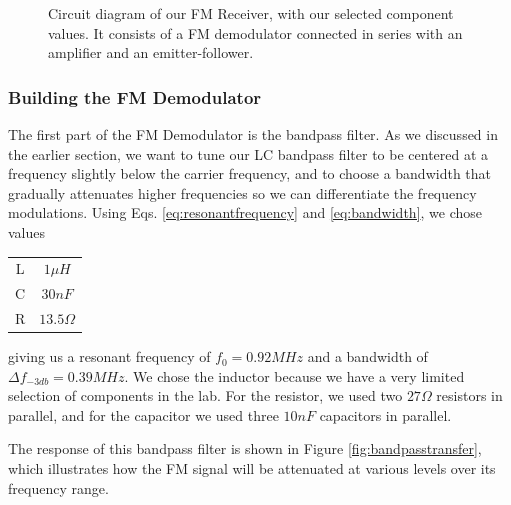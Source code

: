 \documentclass[12pt]{article}
\begin{document}
\begin{figure}[H]
\caption{Circuit diagram of our FM Receiver, with our selected component values. It consists of a FM demodulator connected in series with an amplifier and an emitter-follower.}
\label{fig:circuitdiagram}
\end{figure}

\subsubsection*{Building the FM Demodulator}
The first part of the FM Demodulator is the bandpass filter. As we discussed in the earlier section, we want to tune our LC bandpass filter to be centered at a frequency slightly below the carrier frequency, and to choose a bandwidth that gradually attenuates higher frequencies so we can differentiate the frequency modulations. Using Eqs. \ref{eq:resonantfrequency} and \ref{eq:bandwidth}, we chose values

\begin{center}
  \begin{tabular}{ c  c }
    L & $1\mu H$ \\
    C & $30nF$ \\
    R & $13.5\Omega$ 
  \end{tabular}
\end{center}
giving us a resonant frequency of $f_0 = 0.92 MHz$ and a bandwidth of $\Delta{f}_{-3db} = 0.39 MHz$. We chose the inductor because we have a very limited selection of components in the lab. For the resistor, we used two $27\Omega$ resistors in parallel, and for the capacitor we used three $10nF$ capacitors in parallel.

The response of this bandpass filter is shown in Figure \ref{fig:bandpasstransfer}, which illustrates how the FM signal will be attenuated at various levels over its frequency range.
\end{document}

